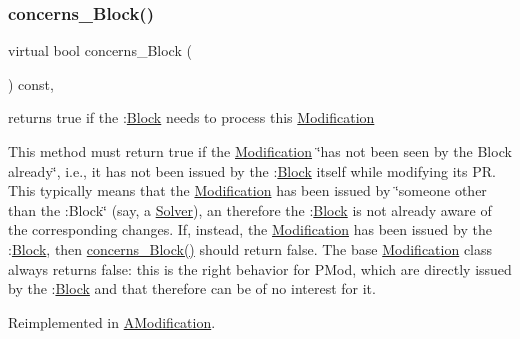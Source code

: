 \subsubsection{\texorpdfstring{concerns\+\_\+\+Block()}{concerns\_Block()}}
{\footnotesize\ttfamily virtual bool concerns\+\_\+\+Block (\begin{DoxyParamCaption}\item[{void}]{ }\end{DoxyParamCaption}) const\hspace{0.3cm}{\ttfamily [inline]}, {\ttfamily [virtual]}}



returns true if the \+:\mbox{\hyperlink{class_s_m_spp__di__unipi__it_1_1_block}{Block}} needs to process this \mbox{\hyperlink{class_s_m_spp__di__unipi__it_1_1_modification}{Modification}} 

This method must return true if the \mbox{\hyperlink{class_s_m_spp__di__unipi__it_1_1_modification}{Modification}} \char`\"{}has not been seen by
the Block already\char`\"{}, i.\+e., it has not been issued by the \+:\mbox{\hyperlink{class_s_m_spp__di__unipi__it_1_1_block}{Block}} itself while modifying its PR. This typically means that the \mbox{\hyperlink{class_s_m_spp__di__unipi__it_1_1_modification}{Modification}} has been issued by \char`\"{}someone other than the \+:\+Block\char`\"{} (say, a \mbox{\hyperlink{class_s_m_spp__di__unipi__it_1_1_solver}{Solver}}), an therefore the \+:\mbox{\hyperlink{class_s_m_spp__di__unipi__it_1_1_block}{Block}} is not already aware of the corresponding changes. If, instead, the \mbox{\hyperlink{class_s_m_spp__di__unipi__it_1_1_modification}{Modification}} has been issued by the \+:\mbox{\hyperlink{class_s_m_spp__di__unipi__it_1_1_block}{Block}}, then \mbox{\hyperlink{class_s_m_spp__di__unipi__it_1_1_modification_a22fe0cccfc755cfd89b240587d1f1cad}{concerns\+\_\+\+Block()}} should return false. The base \mbox{\hyperlink{class_s_m_spp__di__unipi__it_1_1_modification}{Modification}} class always returns false\+: this is the right behavior for P\+Mod, which are directly issued by the \+:\mbox{\hyperlink{class_s_m_spp__di__unipi__it_1_1_block}{Block}} and that therefore can be of no interest for it. 

Reimplemented in \mbox{\hyperlink{class_s_m_spp__di__unipi__it_1_1_a_modification_af4b7df5d253c1ae7a94759df4ac83113}{A\+Modification}}.

\mbox{\label{class_s_m_spp__di__unipi__it_1_1_modification_a74372464f55d9c2cfdb603bf030f902f}} 

